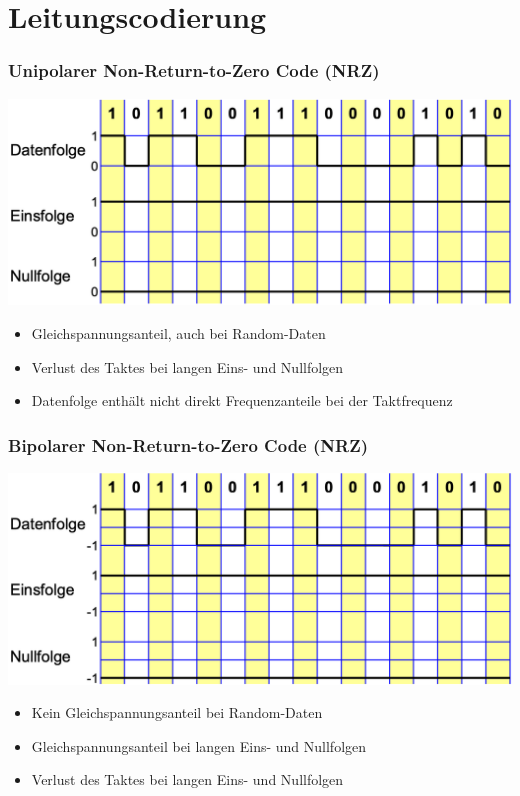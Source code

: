 
\section{Leitungscodierung}

\subsubsection{Unipolarer Non-Return-to-Zero Code (NRZ)}
\begin{center}
    \includegraphics[width=\linewidth]{graphic/signale_analyisieren/Unipolarer Non-Return-to-Zero Code (NRZ).png}
\end{center}
\vspace{-8pt}
\begin{itemize}
    \item Gleichspannungsanteil, auch bei Random-Daten
    \item Verlust des Taktes bei langen Eins- und Nullfolgen
    \item Datenfolge enthält nicht direkt Frequenzanteile bei der Taktfrequenz
\end{itemize}


\subsubsection{Bipolarer Non-Return-to-Zero Code (NRZ)}
\begin{center}
    \includegraphics[width=\linewidth]{graphic/signale_analyisieren/Bipolarer Non-Return-to-Zero Code (NRZ).png}
\end{center}
\vspace{-8pt}
\begin{itemize}
    \item Kein Gleichspannungsanteil bei Random-Daten
    \item Gleichspannungsanteil bei langen Eins- und Nullfolgen
    \item Verlust des Taktes bei langen Eins- und Nullfolgen
\end{itemize}


